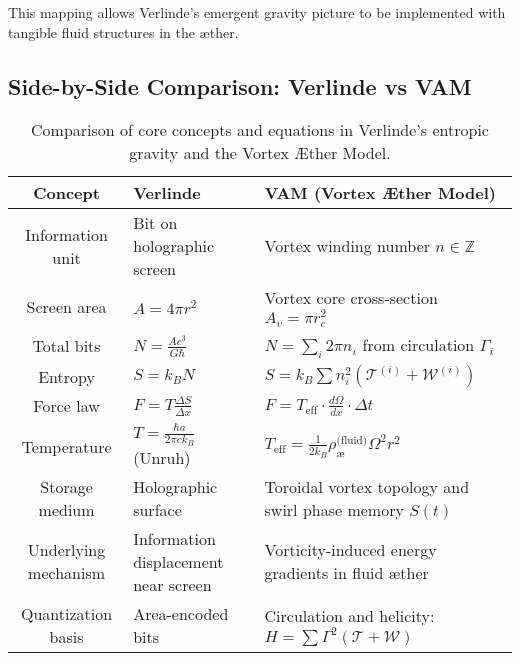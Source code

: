 \documentclass[12pt]{article}
\begin{document}
            This mapping allows Verlinde's emergent gravity picture to be implemented with tangible fluid structures in the æther.

            \subsection{Side-by-Side Comparison: Verlinde vs VAM}
            \begin{table}[H]
                \scriptsize
                \centering
                \renewcommand{\arraystretch}{1.3}
                \setlength{\tabcolsep}{10pt}
                \begin{tabular}{|c|p{5.0cm}|p{7cm}|}
                    \hline
                    \textbf{Concept} & \textbf{Verlinde} & \textbf{VAM (Vortex \AE ther Model)} \\
                    \hline
                    Information unit & Bit on holographic screen & Vortex winding number $n \in \mathbb{Z}$ \\
                    \hline
                    Screen area & $A = 4\pi r^2$ & Vortex core cross-section $A_v = \pi r_c^2$ \\
                    \hline
                    Total bits & $N = \frac{A c^3}{G \hbar}$ & $N = \sum_i 2\pi n_i$ from circulation $\Gamma_i$ \\
                    \hline
                    Entropy & $S = k_B N$ & $S = k_B \sum n_i^2 (\mathcal{T}^{(i)} + \mathcal{W}^{(i)})$ \\
                    \hline
                    Force law & $F = T \frac{\Delta S}{\Delta x}$ & $F = T_\text{eff} \cdot \frac{d\Omega}{dx} \cdot \Delta t$ \\
                    \hline
                    Temperature & $T = \frac{\hbar a}{2\pi c k_B}$ (Unruh) & $T_\text{eff} = \frac{1}{2k_B} \rho_{\text{\ae}}^{\text{(fluid)}} \Omega^2 r^2$ \\
                    \hline
                    Storage medium & Holographic surface & Toroidal vortex topology and swirl phase memory $S(t)$ \\
                    \hline
                    Underlying mechanism & Information displacement near screen & Vorticity-induced energy gradients in fluid æther \\
                    \hline
                    Quantization basis & Area-encoded bits & Circulation and helicity: $H = \sum \Gamma^2(\mathcal{T} + \mathcal{W})$ \\
                    \hline
                \end{tabular}
                \caption{Comparison of core concepts and equations in Verlinde’s entropic gravity and the Vortex \AE ther Model.}
                \label{tab:table}
            \end{table}
\end{document}
